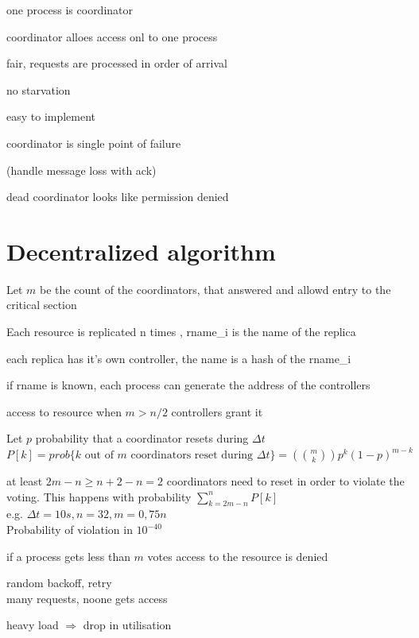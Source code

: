\documentclass[ngerman,a4paper]{report}
\begin{document}
\begin{compactitem}
	\item one process is coordinator
	\item coordinator alloes access onl to one process
	\item fair, requests are processed in order of arrival
	\item no starvation
	\item easy to implement
	\item coordinator is single point of failure
	\item (handle message loss with ack)
	\item dead coordinator looks like permission denied
\end{compactitem}

\section{Decentralized algorithm}
\begin{compactitem}
    \item Let $m$ be the count of the coordinators, that answered and allowd entry to the critical section
	\item Each resource is replicated n times , rname\_i is the name of the replica\\
	\item each replica has it's own controller, the name is a hash of the rname\_i
	\item if rname is known, each process can generate the address of the controllers
	\item access to resource when $m>n/2$ controllers grant it
	\item Let $p$ probability that a coordinator resets during $\Delta t$\\
		$P[k]= prob\lbrace k \text{ out of } m \text{ coordinators reset during } \Delta t\rbrace = \left( \binom{m}{k}\right) p^k (1-p)^{m-k}$
	\item at least $2m-n\geq n+2-n=2$ coordinators need to reset in order to violate the voting. This happens with probability $\sum\limits_{k=2m-n}^n P[k]$\\
		e.g. $\Delta t = 10s, n=32, m=0,75n$\\
		Probability of violation in $10^{-40}$
	\item if a process gets less than $m$ votes access to the resource is denied
	\item random backoff, retry\\
		many requests, noone gets access
	\item heavy load $\Rightarrow$ drop in utilisation
\end{compactitem}
\end{document}
